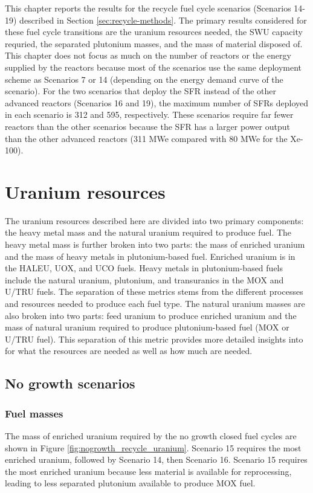 This chapter reports the results for the recycle fuel cycle 
scenarios (Scenarios 14-19) described 
in Section \ref{sec:recycle-methods}. The primary results considered 
for these fuel cycle transitions are the uranium resources needed, 
the \gls{SWU} capacity requried, the separated plutonium masses, 
and the mass of material disposed of. This chapter does not focus 
as much on the number of reactors or the energy supplied by 
the reactors because most of the scenarios use the same 
deployment scheme as Scenarios 7 or 14 (depending on 
the energy demand curve of the scenario). For the two 
scenarios that deploy the \gls{SFR} instead of the other 
advanced reactors (Scenarios 16 and 19), the maximum number 
of \glspl{SFR} deployed in each scenario is 312 and 595, 
respectively. 
These scenarios require far fewer reactors than the other scenarios 
because the \gls{SFR} has a larger power output than the other 
advanced reactors (311 MWe compared with 80 MWe for the Xe-100).

\section{Uranium resources}
The uranium resources described here are divided into two primary 
components: the heavy metal mass and the natural uranium 
required to produce fuel. The heavy metal mass is further 
broken into two parts: the mass of enriched uranium and the 
mass of heavy metals in plutonium-based fuel. Enriched uranium 
is in the 
\gls{HALEU}, \gls{UOX}, and UCO fuels. Heavy metals in plutonium-based 
fuels include the natural uranium, plutonium, and transuranics in 
the \gls{MOX} and U/TRU fuels. The separation of these metrics 
stems from the different processes and resources needed to 
produce each fuel type. The natural uranium masses are also 
broken into two parts: feed uranium to produce enriched uranium 
and the mass of natural uranium required to produce 
plutonium-based fuel (\gls{MOX} or U/TRU fuel). This separation 
of this metric provides more detailed insights into for 
what the resources are needed as well as how much are needed. 

\subsection{No growth scenarios}
\subsubsection{Fuel masses}
The mass of enriched uranium required by the no growth 
closed fuel cycles are shown in Figure \ref{fig:nogrowth_recycle_uranium}.
Scenario 15 requires the most enriched uranium, followed by 
Scenario 14, then Scenario 16. Scenario 15 requires the most enriched 
uranium because less material is available for reprocessing, leading to 
less separated plutonium available to produce \gls{MOX} fuel.

